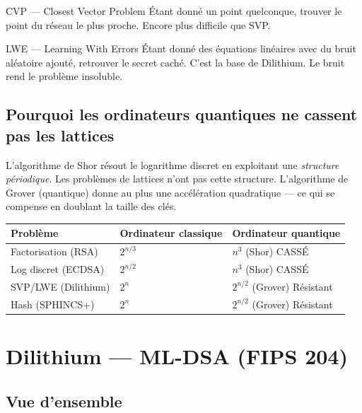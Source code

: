 \documentclass[12pt, a4paper]{article}
\begin{document}
\begin{definition}{CVP --- Closest Vector Problem}
Étant donné un point quelconque, trouver le point du réseau le plus proche.
Encore plus difficile que SVP.
\end{definition}

\begin{definition}{LWE --- Learning With Errors}
Étant donné des équations linéaires avec du bruit aléatoire ajouté, retrouver le
secret caché. C'est la base de Dilithium. Le bruit rend le problème insoluble.
\end{definition}

\subsection{Pourquoi les ordinateurs quantiques ne cassent pas les lattices}

L'algorithme de Shor résout le logarithme discret en exploitant une \textit{structure
périodique}. Les problèmes de lattices n'ont pas cette structure.
L'algorithme de Grover (quantique) donne au plus une accélération quadratique ---
ce qui se compense en doublant la taille des clés.

\begin{center}
\renewcommand{\arraystretch}{1.4}
\begin{tabular}{lll}
  \toprule
  \textbf{Problème} & \textbf{Ordinateur classique} & \textbf{Ordinateur quantique} \\
  \midrule
  Factorisation (RSA) & $2^{n/3}$ & $n^3$ (Shor) \textcolor{danger_red}{CASSÉ} \\
  Log discret (ECDSA) & $2^{n/2}$ & $n^3$ (Shor) \textcolor{danger_red}{CASSÉ} \\
  SVP/LWE (Dilithium) & $2^{n}$ & $2^{n/2}$ (Grover) \textcolor{sol_green}{Résistant} \\
  Hash (SPHINCS+) & $2^{n}$ & $2^{n/2}$ (Grover) \textcolor{sol_green}{Résistant} \\
  \bottomrule
\end{tabular}
\end{center}

\section{Dilithium --- ML-DSA (FIPS 204)}

\subsection{Vue d'ensemble}
\end{document}
